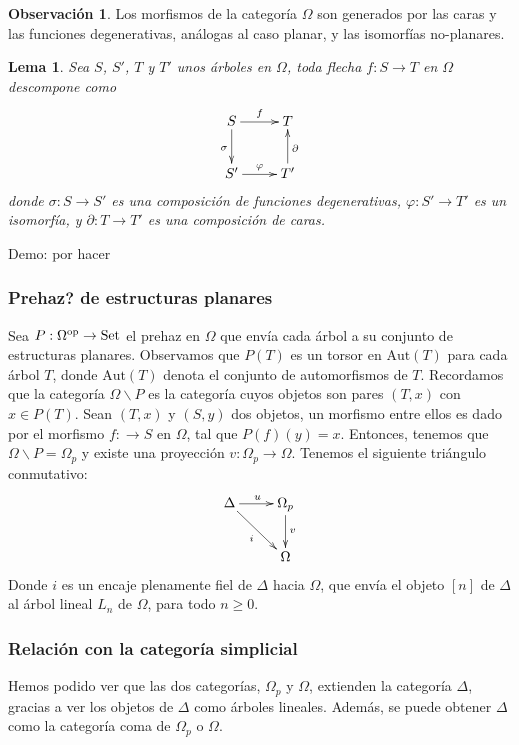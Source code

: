 \documentclass[11pt,a4paper,openright,oneside]{article}
\numberwithin{equation}{section}
\newtheorem{lema}[teo]{Lema}
\theoremstyle{definition}
\newtheorem{obs}[teo]{Observaci\'on}
\newcommand{\Set}{\mathop{\rm Set}}
\begin{document}
\begin{obs}
    Los morfismos de la categor\'ia $\Omega$ son generados por las caras y las funciones degenerativas, an\'alogas al caso planar, y las isomorf\'ias no-planares.
\end{obs}
\begin{lema}
    Sea $S$, $S'$, $T$ y $T'$ unos \'arboles en $\Omega$, toda flecha $f\colon S \to T$ en $\Omega$ descompone como
    $$
        \xymatrix{
            S \ar[d]_{\sigma} \ar[r]^f
            &T \\
            S' \ar[r]^\varphi
            &T' \ar[u]_\partial
        }
    $$
    donde  $\sigma\colon S\to S'$ es una composici\'on de funciones degenerativas, $\varphi\colon S'\to T'$ es un isomorf\'ia, y $\partial\colon T\to T'$ es una composici\'on de caras.
\end{lema}
Demo: por hacer

\subsubsection{Prehaz? de estructuras planares}
Sea $P:\Omega^{\rm op} \to \Set$ el prehaz en $\Omega$ que env\'ia cada \'arbol a su conjunto de estructuras planares. Observamos que $P(T)$ es un torsor en $\text{Aut}(T)$ para cada \'arbol $T$, donde $\text{Aut}(T)$ denota el conjunto de automorfismos de $T$.
Recordamos que la categor\'ia $\Omega\backslash P$ es la categor\'ia cuyos objetos son pares $(T,x)$ con $x\in P(T)$. Sean $(T,x)$ y $(S,y)$ dos objetos, un morfismo entre ellos es dado por el morfismo $f\colon\to S$ en $\Omega$, tal que $P(f)(y) = x$.
Entonces, tenemos que $\Omega\backslash P = \Omega_p$ y existe una proyecci\'on $v\colon\Omega_p\to\Omega$. Tenemos el siguiente tri\'angulo conmutativo:
$$
    \xymatrix{
        \Delta \ar[rd]_{i} \ar[r]^u
        &\Omega_p \ar[d]^v\\
        &\Omega
    }
$$
Donde $i$ es un encaje plenamente fiel  de $\Delta$ hacia $\Omega$, que env\'ia el objeto $[n]$ de $\Delta$ al \'arbol lineal $L_n$ de $\Omega$, para todo $n\ge 0$.
\subsubsection{Relaci\'on con la categor\'ia simplicial}

Hemos podido ver que las dos categor\'ias, $\Omega_p$ y $\Omega$, extienden la categor\'ia $\Delta$, gracias a ver los objetos de $\Delta$ como \'arboles lineales. Adem\'as, se puede obtener $\Delta$ como la categor\'ia coma de $\Omega_p$ o $\Omega$.
\end{document}
